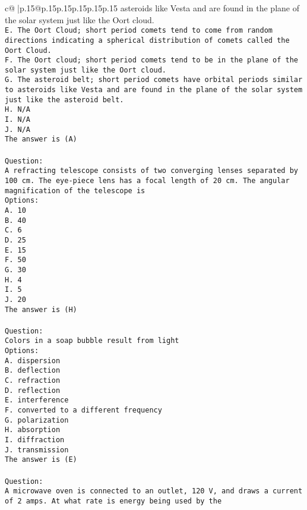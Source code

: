 \documentclass{article}
\begin{document}
{\begin{supertabular}{c@{$\;$}|p{.15\linewidth}@{}p{.15\linewidth}p{.15\linewidth}p{.15\linewidth}p{.15\linewidth}p{.15\linewidth}}
{{{asteroids like Vesta and are found in the plane of the solar system just like the Oort cloud.\\ \tt E. The Oort Cloud; short period comets tend to come from random directions indicating a spherical distribution of comets called the Oort Cloud.\\ \tt F. The Oort cloud; short period comets tend to be in the plane of the solar system just like the Oort cloud.\\ \tt G. The asteroid belt; short period comets have orbital periods similar to asteroids like Vesta and are found in the plane of the solar system just like the asteroid belt.\\ \tt H. N/A\\ \tt I. N/A\\ \tt J. N/A\\ \tt The answer is (A)\\ \tt \\ \tt Question:\\ \tt A refracting telescope consists of two converging lenses separated by 100 cm. The eye-piece lens has a focal length of 20 cm. The angular magnification of the telescope is\\ \tt Options:\\ \tt A. 10\\ \tt B. 40\\ \tt C. 6\\ \tt D. 25\\ \tt E. 15\\ \tt F. 50\\ \tt G. 30\\ \tt H. 4\\ \tt I. 5\\ \tt J. 20\\ \tt The answer is (H)\\ \tt \\ \tt Question:\\ \tt Colors in a soap bubble result from light\\ \tt Options:\\ \tt A. dispersion\\ \tt B. deflection\\ \tt C. refraction\\ \tt D. reflection\\ \tt E. interference\\ \tt F. converted to a different frequency\\ \tt G. polarization\\ \tt H. absorption\\ \tt I. diffraction\\ \tt J. transmission\\ \tt The answer is (E)\\ \tt \\ \tt Question:\\ \tt A microwave oven is connected to an outlet, 120 V, and draws a current of 2 amps. At what rate is energy being used by the }}}
\end{supertabular}}
\end{document}
